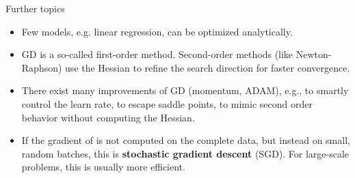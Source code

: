 \documentclass[11pt,compress,t,notes=noshow, xcolor=table]{beamer}
\begin{document}
\begin{vbframe}{Further topics}
\begin{itemize}

\item Few models, e.g. linear regression, can be optimized analytically. 

\item GD is a so-called first-order method. Second-order methods (like Newton-Raphson) use the Hessian to refine the search direction for faster convergence.
\item There exist many improvements of GD (momentum, ADAM), e.g., to smartly control the learn rate, to escape saddle points, to mimic second order behavior without computing the Hessian.
\item If the gradient of is not computed on the complete data, but instead on small, random batches, this is \textbf{stochastic gradient descent} (SGD). For large-scale problems, this is usually more efficient.
\end{itemize}
\end{vbframe}




\endlecture
\end{document}
